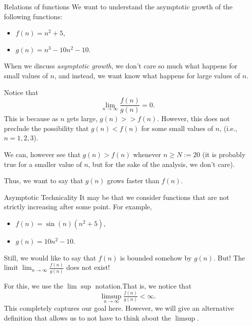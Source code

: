 \begin{example}{Relations of functions}{}
We want to understand the asymptotic growth of the following functions:
\begin{itemize}
\item $f(n) = n^2 + 5$,
\item $g(n) = n^3 - 10n^2 -10$.
\end{itemize}

When we discuss \emph{asymptotic growth}, we don't care so much what happens for small values of $n$, and instead, we want know what happens for large values of $n$.

Notice that 
\begin{equation}
\lim_{n \to \infty} \frac{f(n)}{g(n)} = 0.
\end{equation}
This is because as $n$ gets large, $g(n) >> f(n)$.  However, this does not preclude the possibility that $g(n) < f(n)$ for some small values of $n$, (i.e., $n=1,2,3$).

We can, however see that $g(n) > f(n)$ whenever $n \geq N:= 20$ (it is probably true for a smaller value of $n$, but for the sake of the analysis, we don't care).

Thus, we want to say that $g(n)$ grows faster than $f(n)$.

%
%
%
%
%
%
%
\end{example}

\begin{example}{Asymptotic Technicality}{}
It may be that we consider functions that are not strictly increasing after some point.  For example,
\begin{itemize}
\item $f(n) = \sin(n)(n^2 + 5)$,
\item $g(n) = 10n^2 -10$.
\end{itemize}

Still, we would like to say that $f(n)$ is bounded somehow by $g(n)$.  But!   The limit $\lim_{n \to \infty} \tfrac{f(n)}{g(n)}$ does not exist!

For this, we use the $\lim\sup$ notation.That is, we notice that 
\begin{equation}
\limsup_{n\to \infty} \tfrac{f(n)}{g(n)} < \infty.
\end{equation}
This completely captures our goal here.  However, we will give an alternative definition that allows us to not have to think about the $\limsup$.
\end{example}


